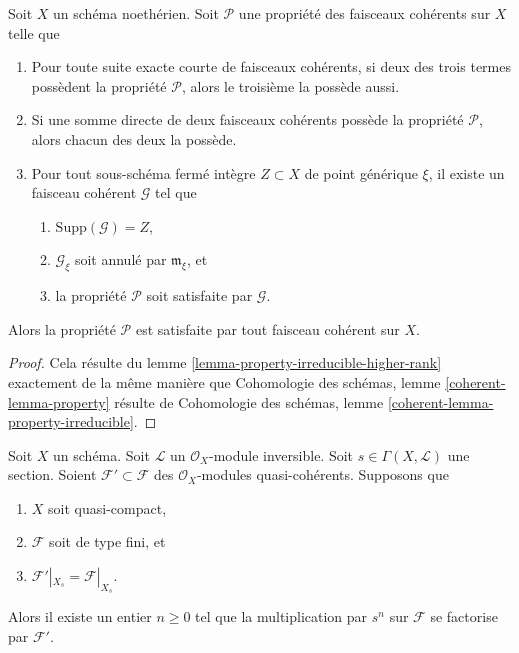 \begin{lemma}
\label{lemma-property-higher-rank}
Soit $X$ un schéma noethérien.
Soit $\mathcal{P}$ une propriété des faisceaux cohérents sur $X$ telle que
\begin{enumerate}
\item Pour toute suite exacte courte de faisceaux cohérents, si deux
des trois termes possèdent la propriété $\mathcal{P}$, alors le troisième
la possède aussi.
\item Si une somme directe de deux faisceaux cohérents possède la propriété
$\mathcal{P}$, alors chacun des deux la possède.
\item Pour tout sous-schéma fermé intègre $Z \subset X$
de point générique $\xi$, il existe
un faisceau cohérent $\mathcal{G}$ tel que
\begin{enumerate}
\item $\text{Supp}(\mathcal{G}) = Z$,
\item $\mathcal{G}_\xi$ soit annulé par $\mathfrak m_\xi$, et
\item la propriété $\mathcal{P}$ soit satisfaite par $\mathcal{G}$.
\end{enumerate}
\end{enumerate}
Alors la propriété $\mathcal{P}$ est satisfaite par tout faisceau cohérent sur $X$.
\end{lemma}

\begin{proof}
Cela résulte du lemme \ref{lemma-property-irreducible-higher-rank}
exactement de la même manière que
Cohomologie des schémas, lemme \ref{coherent-lemma-property} résulte de
Cohomologie des schémas, lemme \ref{coherent-lemma-property-irreducible}.
\end{proof}

\begin{lemma}
\label{lemma-section-maps-back-into}
Soit $X$ un schéma.
Soit $\mathcal{L}$ un $\mathcal{O}_X$-module inversible.
Soit $s \in \Gamma(X, \mathcal{L})$ une section.
Soient $\mathcal{F}' \subset \mathcal{F}$ des
$\mathcal{O}_X$-modules quasi-cohérents. Supposons que
\begin{enumerate}
\item $X$ soit quasi-compact,
\item $\mathcal{F}$ soit de type fini, et
\item $\mathcal{F}'|_{X_s} = \mathcal{F}|_{X_s}$.
\end{enumerate}
Alors il existe un entier $n \geq 0$ tel que
la multiplication par $s^n$ sur $\mathcal{F}$ se factorise
par $\mathcal{F}'$.
\end{lemma}


